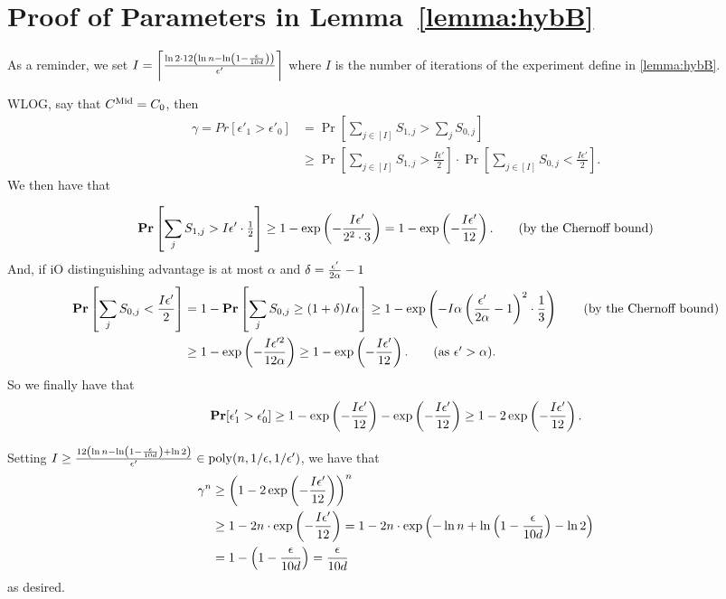 \section{Proof of Parameters in Lemma~\ref{lemma:hybB}}
\label{appendix:paramHybB}

As a reminder, we set $I =\left\lceil \frac{\ln2 \cdot 12\left(\ln n - \ln \left(1 - \frac{\epsilon}{10d}\right)\right)}{\epsilon'} \right\rceil$ where $I$
is the number of iterations of the experiment define in \cref{lemma:hybB}.

WLOG, say that $C^{\text{Mid}} = C_0$, then
\begin{align*}
	\gamma = Pr[\epsilon'_1 > \epsilon'_0] &= \Pr\left[\sum_{j \in [I]} S_{1, j} > \sum_{j} S_{0, j}\right]\\
	&\geq \Pr\left[\sum_{j \in [I]} S_{1, j} > \frac{I\epsilon'}{2}\right] \cdot \Pr\left[\sum_{j \in [I]} S_{0, j} < \frac{I\epsilon'}{2}\right].
\end{align*}
We then have that

\begin{align*}
	\operatorname*{\mathbf{Pr}}\left[\sum_{j} S_{1, j} > I\epsilon' \cdot \tfrac{1}{2}\right] \geq 1 - \exp\left( -\frac{I\epsilon'}{2^2 \cdot 3}\right) =  1 - \exp\left( -\frac{I\epsilon'}{12}\right). \tag{by the Chernoff bound}
\end{align*}
And, if iO distinguishing advantage is at most $\alpha$ and $\delta = \frac{\epsilon'}{2\alpha} - 1$
\begin{align*}
	\Pr\left[\sum_{j} S_{0, j} < \frac{I\epsilon'}{2}\right] &= 1 - \Pr\left[\sum_{j} S_{0, j} \geq  (1 + \delta) I\alpha\right]
	\geq 1 - \exp\left( - I \alpha \left(\frac{\eps'}{2\alpha} - 1\right)^2 \cdot \frac{1}{3} \right) \tag{by the Chernoff bound}\\
	&\geq 1 - \exp\left( - \frac{I\eps'^2}{12\alpha}\right) \geq 1 - \exp\left(-\frac{I\eps'}{12}\right). \tag{as $\eps' > \alpha$}.
\end{align*}
So we finally have that
\begin{equation}
	\operatorname*{\mathbf{Pr}}[\epsilon'_1 > \epsilon'_0] \geq 1 - \exp\left(-\frac{I\epsilon'}{12}\right) - \exp\left( -\frac{I\epsilon'}{12}\right) \geq 1 - 2\exp\left( -\frac{I\epsilon'}{12}\right). 
\end{equation}

Setting $I \geq \frac{12\left(\ln n - \ln\left(1 - \frac{\epsilon}{10d}\right) + \ln 2\right)}{\epsilon'} \in \operatorname{poly}(n, 1/\epsilon, 1/\epsilon')$, we have that
\begin{align*}
	\gamma^n &\geq \left(1 - 2\exp\left( -\frac{I\epsilon'}{12}\right)\right)^n \\
	&\geq 1 - 2n \cdot \exp\left( -\frac{I\epsilon'}{12}\right) = 1 - 2n \cdot \exp\left(-\ln n + \ln\left(1 - \frac{\epsilon}{10d}\right) - \ln 2\right)\\
	&= 1 - \left(1 - \frac{\epsilon}{10d}\right) = \frac{\epsilon}{10d}
\end{align*}
as desired.
